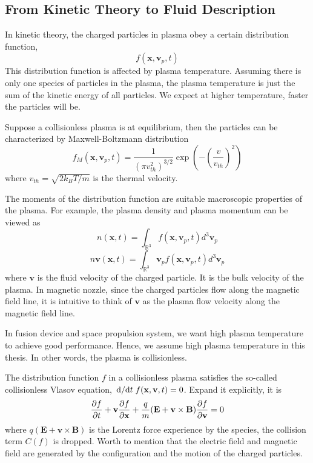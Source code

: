 \subsection{From Kinetic Theory to Fluid Description}
In kinetic theory, the charged particles in plasma obey a certain distribution function,
\[f(\mathbf{x}, \mathbf{v}_p, t)\]
This distribution function is affected by plasma temperature. Assuming there is only one species of particles in the plasma, the plasma temperature is just the sum of the kinetic energy of all particles. We expect at higher temperature, faster the particles will be.

Suppose a collisionless plasma is at equilibrium, then the particles can be characterized by Maxwell-Boltzmann distribution
\[ f_M(\mathbf{x}, \mathbf{v}_p, t) = \frac{1}{(\pi v_{th}^2)^{3/2}} \exp(-\left(\frac{v}{v_{th}}\right)^2) \]
where $v_{th} = \sqrt{2k_BT/m}$ is the thermal velocity.

The moments of the distribution function are suitable macroscopic properties of the plasma. For example, the plasma density and plasma momentum can be viewed as
\[ n(\mathbf{x}, t) = \int_{\mathbb{R}^3} f(\mathbf{x}, \mathbf{v}_p, t) d^3\mathbf{v}_p \]
\[ n\mathbf{v}(\mathbf{x}, t) = \int_{\mathbb{R}^3} \mathbf{v}_p f(\mathbf{x}, \mathbf{v}_p, t) d^3\mathbf{v}_p \]
where $\mathbf{v}$ is the fluid velocity of the charged particle. It is the bulk velocity of the plasma. In magnetic nozzle, since the charged particles flow along the magnetic field line, it is intuitive to think of $\mathbf{v}$ as the plasma flow velocity along the magnetic field line.

In fusion device and space propulsion system, we want high plasma temperature to achieve good performance. Hence, we assume high plasma temperature in this thesis. In other words, the plasma is collisionless.

The distribution function $f$ in a collisionless plasma satisfies the so-called collisionless Vlasov equation, $\dv*{t} f(\mathbf{x}, \mathbf{v}, t) = 0$. Expand it explicitly, it is
\begin{equation} \label{eq:vlasov}
	\pdv{f}{t} + \mathbf{v}\pdv{f}{\mathbf{x}} + \frac{q}{m}(\mathbf{E} + \mathbf{v}\times\mathbf{B})\pdv{f}{\mathbf{v}} = 0
\end{equation}
where $q(\mathbf{E} + \mathbf{v}\times\mathbf{B})$ is the Lorentz force experience by the species, the collision term $C(f)$ is dropped. Worth to mention that the electric field and magnetic field are generated by the configuration and the motion of the charged particles.

